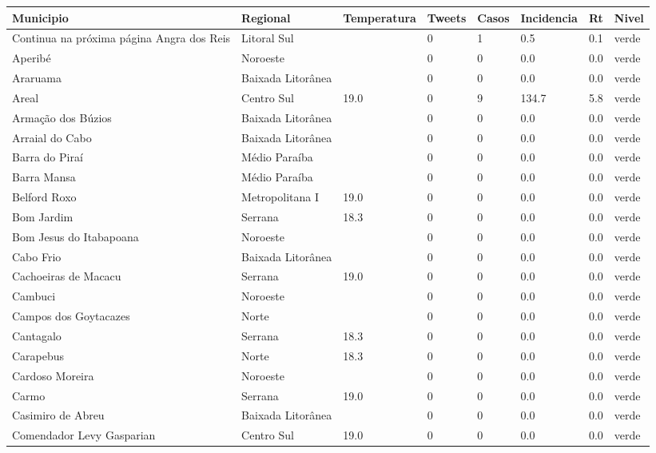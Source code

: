 \begin{longtable}{l|lllllll}
  \hline
Municipio & Regional & Temperatura & Tweets & Casos & Incidencia & Rt & Nivel \\ 
  \hline
\endhead
\hline
{\footnotesize Continua na próxima página}
\endfoot
\endlastfoot
Angra dos Reis & Litoral Sul &  & 0 & 1 & 0.5 & 0.1 & verde \\ 
  Aperibé & Noroeste &  & 0 & 0 & 0.0 & 0.0 & verde \\ 
  Araruama & Baixada Litorânea &  & 0 & 0 & 0.0 & 0.0 & verde \\ 
  Areal & Centro Sul & 19.0 & 0 & 9 & 134.7 & 5.8 & verde \\ 
  Armação dos Búzios & Baixada Litorânea &  & 0 & 0 & 0.0 & 0.0 & verde \\ 
  Arraial do Cabo & Baixada Litorânea &  & 0 & 0 & 0.0 & 0.0 & verde \\ 
  Barra do Piraí & Médio Paraíba &  & 0 & 0 & 0.0 & 0.0 & verde \\ 
  Barra Mansa & Médio Paraíba &  & 0 & 0 & 0.0 & 0.0 & verde \\ 
  Belford Roxo & Metropolitana I & 19.0 & 0 & 0 & 0.0 & 0.0 & verde \\ 
  Bom Jardim & Serrana & 18.3 & 0 & 0 & 0.0 & 0.0 & verde \\ 
  Bom Jesus do Itabapoana & Noroeste &  & 0 & 0 & 0.0 & 0.0 & verde \\ 
  Cabo Frio & Baixada Litorânea &  & 0 & 0 & 0.0 & 0.0 & verde \\ 
  Cachoeiras de Macacu & Serrana & 19.0 & 0 & 0 & 0.0 & 0.0 & verde \\ 
  Cambuci & Noroeste &  & 0 & 0 & 0.0 & 0.0 & verde \\ 
  Campos dos Goytacazes & Norte &  & 0 & 0 & 0.0 & 0.0 & verde \\ 
  Cantagalo & Serrana & 18.3 & 0 & 0 & 0.0 & 0.0 & verde \\ 
  Carapebus & Norte & 18.3 & 0 & 0 & 0.0 & 0.0 & verde \\ 
  Cardoso Moreira & Noroeste &  & 0 & 0 & 0.0 & 0.0 & verde \\ 
  Carmo & Serrana & 19.0 & 0 & 0 & 0.0 & 0.0 & verde \\ 
  Casimiro de Abreu & Baixada Litorânea &  & 0 & 0 & 0.0 & 0.0 & verde \\ 
  Comendador Levy Gasparian & Centro Sul & 19.0 & 0 & 0 & 0.0 & 0.0 & verde \\ 

\end{longtable}
